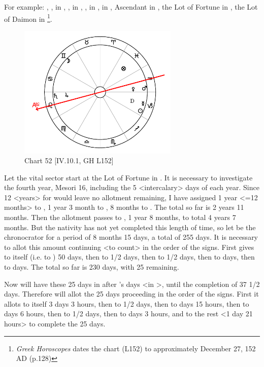 For example: \Sun, \Mercury, in \Capricorn, \Saturn, \Jupiter\xspace in \Leo, \Mars, \Venus\xspace in \Aquarius, \Moon\xspace in \Gemini, Ascendant in \Leo, the Lot of Fortune in \Pisces, the Lot of Daimon in \Capricorn
\footnote{\textit{Greek Horoscopes} dates the chart (L152) to approximately December 27, 152 AD (p.128)}. 

\clearpage
\begin{figure}
\centering
\vspace{-20pt}
\includegraphics[width=0.68\textwidth]{charts/4_10_1}
\caption{Chart 52 [IV.10.1, GH L152]}
\label{fig:chart52}
\end{figure} 

Let the vital sector start at the Lot of Fortune in \Pisces. It is necessary to investigate the fourth year, Mesori 16,
including the 5 <intercalary> days of each year. Since 12 <years> for \Pisces would leave no allotment remaining, I have assigned 1 year <=12 months> to \Pisces, 1 year 3 month to \Aries, 8 months to \Taurus. The total so far is 2 years 11 months. Then the allotment passes to \Mercury, 1 year 8 months, to total 4 years 7 months. But the nativity has not yet completed this length of time, so let \Mercury\xspace be the chronocrator for a period of 8 months 15 days, a total of 255 days. It is necessary to allot this amount continuing <to count> in the order of the signs. First \Mercury\xspace gives to itself (i.e. to \Gemini) 50 days, then to \Cancer\xspace 62 1/2 days, then to \Leo\xspace 47 1/2 days, then to \Virgo\xspace 50 days, then to  days. The total so far is 230 days, with 25 remaining. 

Now \Mars will have these 25 days in \Scorpio\xspace after \Venus's days <in \Libra>, until the completion of 37 1/2 days. Therefore \Mars\xspace will allot the 25 days proceeding in the order of the signs. First it allots to itself 3 days 3 hours, then to \Sagittarius\xspace 2 1/2 days, then to
\Capricorn\xspace 5 days 15 hours, then to \Aquarius\xspace 6 days 6 hours, then to \Pisces\xspace 2 1/2 days, then to \Aries\xspace 3 days 3 hours, and to \Taurus\xspace the rest <1 day 21 hours> to complete the 25 days. 

